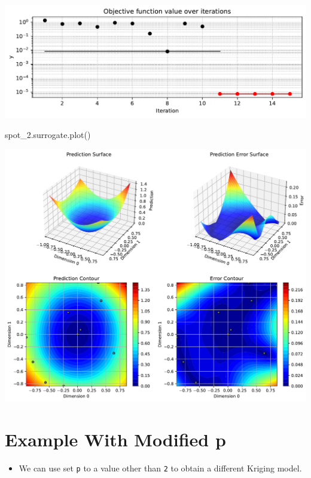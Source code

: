 \documentclass[
  letterpaper,
  DIV=11,
  numbers=noendperiod]{scrreprt}
\newenvironment{Shaded}{\begin{snugshade}}{\end{snugshade}}
\newcommand{\NormalTok}[1]{\textcolor[rgb]{0.00,0.23,0.31}{#1}}
\providecommand{\tightlist}{%
  \setlength{\itemsep}{0pt}\setlength{\parskip}{0pt}}\usepackage{longtable,booktabs,array}
\begin{document}
\includegraphics{015_num_spot_correlation_p_files/figure-pdf/cell-7-output-1.pdf}

\begin{Shaded}
\begin{Highlighting}[]
\NormalTok{spot\_2.surrogate.plot()}
\end{Highlighting}
\end{Shaded}

\includegraphics{015_num_spot_correlation_p_files/figure-pdf/cell-8-output-1.pdf}

\section{Example With Modified p}\label{example-with-modified-p}

\begin{itemize}
\tightlist
\item
  We can use set \texttt{p} to a value other than \texttt{2} to obtain a
  different Kriging model.
\end{itemize}
\end{document}
